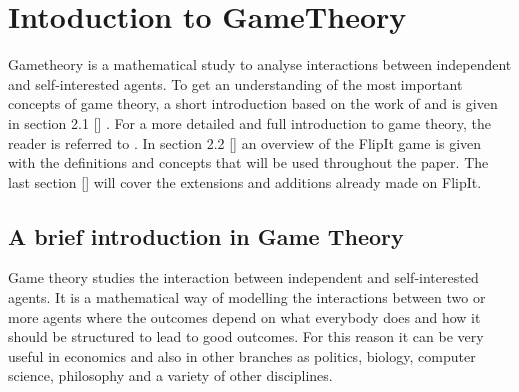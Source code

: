 \chapter{Intoduction to GameTheory}
\label{cha:1}
%


Gametheory is a mathematical study to analyse interactions between independent and self-interested agents. To get an understanding of the most important concepts of game theory, a short introduction based on the work of 
\cite{leyton2008essentials} and  is given in section 2.1 [] . For a more detailed and full introduction to game theory, the reader is referred to 
\cite{MitigationCovert}.  In section 2.2 []  an overview of the FlipIt game is given with the definitions and concepts that will be used throughout the paper.
The last section []  will cover the extensions and additions already made on FlipIt.

\section{A brief introduction in Game Theory}
\label{Cha:1:Intro.Game.Theory}




Game theory studies the interaction between independent and self-interested agents. It is a mathematical way of modelling the interactions between two or more agents where the outcomes depend on what everybody does and how it should be structured to lead to good outcomes. For this reason it can be very useful in economics and also in other branches as politics, biology, computer science, philosophy and a variety of other disciplines.  \\

